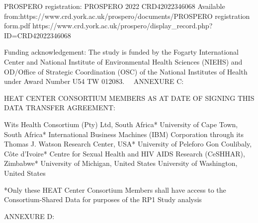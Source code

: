 \documentclass[12pt,letterpaper]{article}
\begin{document}
PROSPERO registration: PROSPERO 2022 CRD42022346068 Available from:https://www.crd.york.ac.uk/prospero/documents/PROSPERO registration form.pdf https://www.crd.york.ac.uk/prospero/display\_record.php?ID=CRD42022346068

Funding acknowledgement: The study is funded by the Fogarty International Center and National Institute of Environmental Health Sciences (NIEHS) and OD/Office of Strategic Coordination (OSC) of the National Institutes of Health under Award Number U54 TW 012083.  ANNEXURE C:

HEAT CENTER CONSORTIUM MEMBERS AS AT DATE OF SIGNING THIS DATA TRANSFER AGREEMENT:

Wits Health Consortium (Pty) Ltd, South Africa*   University of Cape Town, South Africa* International Business Machines (IBM) Corporation through its Thomas J. Watson Research Center, USA*   University of Peleforo Gon Coulibaly, Côte d’Ivoire*  Centre for Sexual Health and HIV AIDS Research (CeSHHAR), Zimbabwe* University of Michigan, United States University of Washington, United States

*Only these HEAT Center Consortium Members shall have access to the Consortium-Shared Data for purposes of the RP1 Study analysis 

ANNEXURE D:
\end{document}
